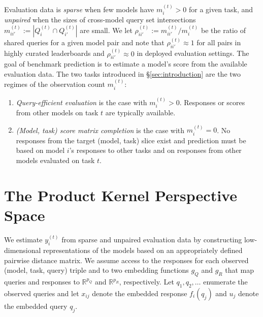 \documentclass{article}
\theoremstyle{definition}
\theoremstyle{remark}
\theoremstyle{plain}
\begin{document}
Evaluation data is \emph{sparse} when few models have
$m_{i}^{(t)}>0$ for a given task, and \emph{unpaired} when the sizes of cross-model query set intersections 
$m_{ii'}^{(t)}:=|Q_{i}^{(t)}\cap Q_{i'}^{(t)}|$ are small. We let
$\rho_{ii'}^{(t)}:=m_{ii'}^{(t)}/m_{i}^{(t)}$ be the ratio of shared queries for a
given model pair and note that $\rho_{ii'}^{(t)}\approx1$ for all pairs in highly curated
leaderboards and $\rho_{ii'}^{(t)}\approx0$ in deployed evaluation settings.
The goal of benchmark prediction is to estimate a model's score from the available
evaluation data.
The two tasks introduced in \S\ref{sec:introduction} are the two regimes of the
observation count $m_i^{(t)}$:
\begin{enumerate}[wide, labelwidth=1pt, labelindent=12pt]
\setlength{\itemsep}{1pt}\setlength{\parskip}{0pt}
\item \emph{Query-efficient evaluation} is the case
with $m_{i}^{(t)}>0$. Responses or scores from other models on task $t$ are
typically available.
\item \emph{(Model, task) score matrix completion} is the case with $m_{i}^{(t)}=0$.
No responses from the target (model, task) slice exist and prediction
must be based on model $i$'s responses to other tasks and on responses from
other models evaluated on task $t$.
\end{enumerate}

\section{The Product Kernel Perspective Space}
\label{sec:method}

We estimate $y_i^{(t)}$ from sparse and unpaired
evaluation data by constructing low-dimensional
representations of the models based on an appropriately defined pairwise distance
matrix.
We assume access to the responses for each observed (model, task, query) triple and
to two embedding functions $g_{Q}$ and $g_{R}$ that map
queries and responses to $\mathbb{R}^{p_{Q}}$ and $\mathbb{R}^{p_{R}}$, respectively.
Let $q_{1},q_{2},\hdots$ enumerate the observed queries and let
$x_{ij}$ denote the embedded response $f_{i}(q_{j})$ and $u_{j}$ denote the embedded
query $q_{j}$.
\end{document}
